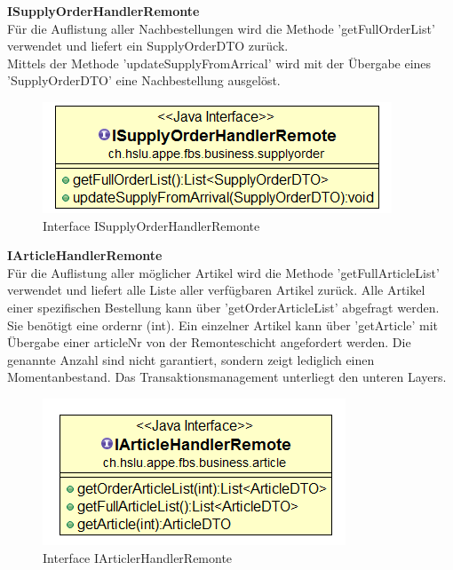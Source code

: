 \textbf{ISupplyOrderHandlerRemonte}\\
Für die Auflistung aller Nachbestellungen wird die Methode 'getFullOrderList' verwendet und liefert ein SupplyOrderDTO zurück.\\
Mittels der Methode 'updateSupplyFromArrical' wird mit der Übergabe eines 'SupplyOrderDTO' eine Nachbestellung ausgelöst. 
\begin{figure}[H]
	\includegraphics[width=0.6\linewidth]{Images/ISupplyOrderHandlerRemonte}
	\caption{Interface ISupplyOrderHandlerRemonte}
	\label{fig:if-ISupplyOrderHandler}
\end{figure}


\textbf{IArticleHandlerRemonte}\\
Für die Auflistung aller möglicher Artikel wird die Methode 'getFullArticleList' verwendet und liefert alle Liste aller verfügbaren Artikel zurück. Alle Artikel einer spezifischen Bestellung kann über 'getOrderArticleList' abgefragt werden. Sie benötigt eine ordernr (int). Ein einzelner Artikel kann über 'getArticle' mit Übergabe einer articleNr von der Remonteschicht angefordert werden. Die genannte Anzahl sind nicht garantiert, sondern zeigt lediglich einen Momentanbestand. Das Transaktionsmanagement unterliegt den unteren Layers.
\begin{figure}[H]
	\includegraphics[width=0.6\linewidth]{Images/IArticleHandlerRemonte}
	\caption{Interface IArticlerHandlerRemonte}
	\label{fig:if-IArticleHandlerRemonte}
\end{figure}

